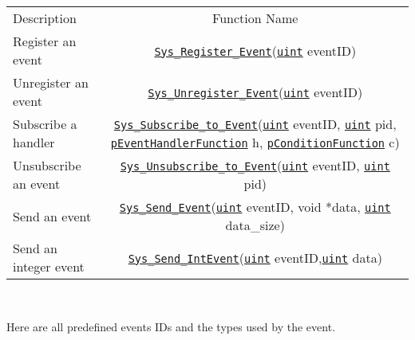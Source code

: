 \documentclass[a4paper,9pt]{extarticle}
\newcommand{\uintt}{\href{http://openswarm.org/os-doc/d6/dc2/definitions\_8h.html\#a1445ebbbf93d62972255ec5e89a5ab01}{\texttt{uint}}\xspace}
\newcommand{\pEventHandlerFunction}{\href{http://openswarm.org/os-doc/db/dd2/events\_8h.html\#a3db5730a7fed6827a4c46ff3fae3e55b}{\texttt{pEventHandlerFunction}}\xspace}
\newcommand{\pConditionFunction}{\href{http://openswarm.org/os-doc/db/dd2/events\_8h.html\#a653a4a4b7d9f5a65e1415365267a9d9e}{\texttt{pConditionFunction}}\xspace}
\begin{document}
 
\begin{center} 
\begin{tabular}{lc}
    \rowcolor{blue!50}
    Description				&	Function Name\\
    Register an event & \href{http://openswarm.org/os-doc/de/deb/events_8c.html#a5d9657772509ddb7ac6f6e1aa5730308}{\texttt{Sys\_Register\_Event}}(\uintt eventID) \\
    Unregister an event  	& 	\href{http://openswarm.org/os-doc/db/dd2/events_8h.html#a41c81e9472691694352ac8316dc0ddbf}{\texttt{Sys\_Unregister\_Event}}(\uintt eventID) \\
    Subscribe a handler  	& 	\href{http://openswarm.org/os-doc/db/dd2/events_8h.html#a41c81e9472691694352ac8316dc0ddbf}{\texttt{Sys\_Subscribe\_to\_Event}}(\uintt eventID, \uintt pid, \pEventHandlerFunction h, \pConditionFunction c) \\
    Unsubscribe an event 	& 	\href{http://openswarm.org/os-doc/db/dd2/events_8h.html#a41c81e9472691694352ac8316dc0ddbf}{\texttt{Sys\_Unsubscribe\_to\_Event}}(\uintt eventID, \uintt pid) \\
    Send an event 	& 	\href{http://openswarm.org/os-doc/de/deb/events_8c.html#a67230a5307e77a8112e56436f372926f}{\texttt{Sys\_Send\_Event}}(\uintt eventID,  void *data, \uintt data\_size) \\
    Send an integer event 	& 	\href{http://openswarm.org/os-doc/de/deb/events_8c.html#a67230a5307e77a8112e56436f372926f}{\texttt{Sys\_Send\_IntEvent}}(\uintt eventID,\uintt data)
\end{tabular}\\
\end{center}

Here are all predefined events IDs and the types used by the event. \\
\end{document}

